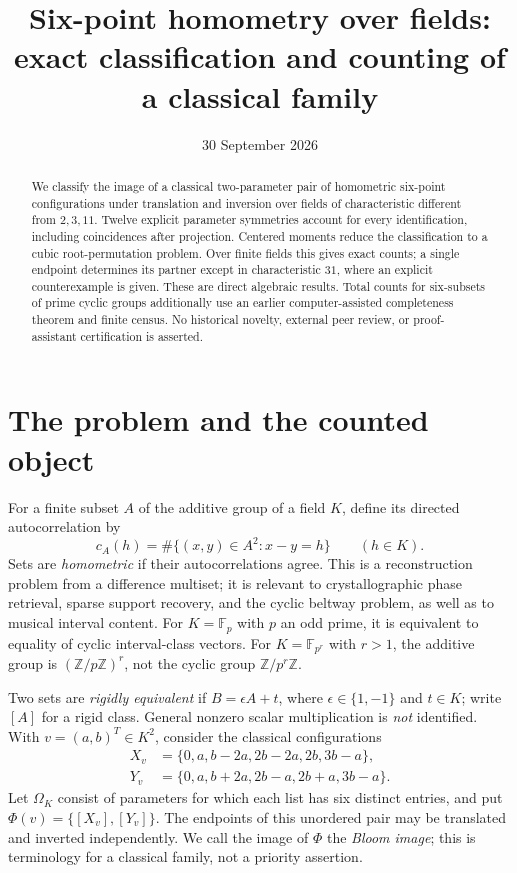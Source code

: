 \documentclass[11pt]{article}
\title{Six-point homometry over fields:\\exact classification and counting of a classical family}
\author{}
\date{30 September 2026}
\newcommand{\F}{\mathbb F}
\newcommand{\Z}{\mathbb Z}
\newcommand{\Om}{\Omega_K}
\begin{document}
\maketitle\thispagestyle{empty}
\begin{abstract}
We classify the image of a classical two-parameter pair of homometric
six-point configurations under translation and inversion over fields of
characteristic different from $2,3,11$. Twelve explicit parameter symmetries
account for every identification, including coincidences after projection.
Centered moments reduce the classification to a cubic root-permutation
problem. Over finite fields this gives exact counts; a single endpoint
determines its partner except in characteristic $31$, where an explicit
counterexample is given. These are direct algebraic results. Total counts
for six-subsets of prime cyclic groups additionally use an earlier
computer-assisted completeness theorem and finite census. No historical
novelty, external peer review, or proof-assistant certification is asserted.
\end{abstract}

\section{The problem and the counted object}
For a finite subset $A$ of the additive group of a field $K$, define its
directed autocorrelation by
\[
 c_A(h)=\#\{(x,y)\in A^2:x-y=h\}\qquad(h\in K).
\]
Sets are \emph{homometric} if their autocorrelations agree. This is a
reconstruction problem from a difference multiset; it is relevant to
crystallographic phase retrieval, sparse support recovery, and the cyclic
beltway problem, as well as to musical interval content. For $K=\F_p$ with
$p$ an odd prime, it is equivalent to equality of cyclic interval-class
vectors. For $K=\F_{p^r}$ with $r>1$, the additive group is
$(\Z/p\Z)^r$, not the cyclic group $\Z/p^r\Z$.

Two sets are \emph{rigidly equivalent} if $B=\epsilon A+t$, where
$\epsilon\in\{1,-1\}$ and $t\in K$; write $[A]$ for a rigid class.
General nonzero scalar multiplication is \emph{not} identified. With
$v=(a,b)^T\in K^2$, consider the classical configurations
\begin{align*}
 X_v&=\{0,a,b-2a,2b-2a,2b,3b-a\},\\
 Y_v&=\{0,a,b+2a,2b-a,2b+a,3b-a\}.
\end{align*}
Let $\Om$ consist of parameters for which each list has six distinct
entries, and put $\Phi(v)=\{[X_v],[Y_v]\}$. The endpoints of this
unordered pair may be translated and inverted independently.
We call the image of $\Phi$ the \emph{Bloom image}; this is terminology
for a classical family, not a priority assertion.
\end{document}
